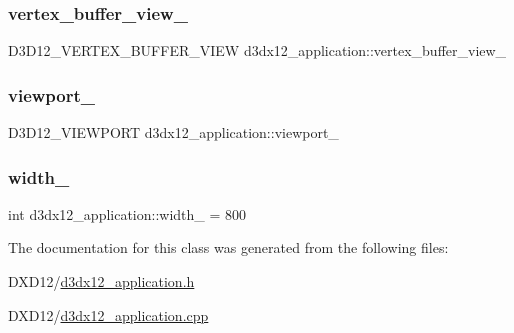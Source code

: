 \subsubsection{\texorpdfstring{vertex\+\_\+buffer\+\_\+view\+\_\+}{vertex\_buffer\_view\_}}
{\footnotesize\ttfamily D3\+D12\+\_\+\+V\+E\+R\+T\+E\+X\+\_\+\+B\+U\+F\+F\+E\+R\+\_\+\+V\+I\+EW d3dx12\+\_\+application\+::vertex\+\_\+buffer\+\_\+view\+\_\+\hspace{0.3cm}{\ttfamily [private]}}

\mbox{\label{classd3dx12__application_a3850b4dd8680e9cc85fac2919dde853a}} 
\subsubsection{\texorpdfstring{viewport\+\_\+}{viewport\_}}
{\footnotesize\ttfamily D3\+D12\+\_\+\+V\+I\+E\+W\+P\+O\+RT d3dx12\+\_\+application\+::viewport\+\_\+\hspace{0.3cm}{\ttfamily [private]}}

\mbox{\label{classd3dx12__application_ae3510bf48db929de749956b6d7997a4a}} 
\subsubsection{\texorpdfstring{width\+\_\+}{width\_}}
{\footnotesize\ttfamily int d3dx12\+\_\+application\+::width\+\_\+ = 800\hspace{0.3cm}{\ttfamily [protected]}}



The documentation for this class was generated from the following files\+:\begin{DoxyCompactItemize}
\item 
D\+X\+D12/\mbox{\hyperlink{d3dx12__application_8h}{d3dx12\+\_\+application.\+h}}\item 
D\+X\+D12/\mbox{\hyperlink{d3dx12__application_8cpp}{d3dx12\+\_\+application.\+cpp}}\end{DoxyCompactItemize}
